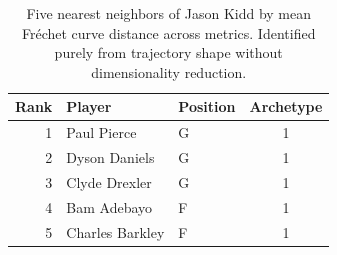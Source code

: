 \begin{table}[htbp]
  \centering\small
  \begin{tabular}{rllc}
    \toprule
    Rank & Player & Position & Archetype \\
    \midrule
    1 & Paul Pierce & G & 1 \\
    2 & Dyson Daniels & G & 1 \\
    3 & Clyde Drexler & G & 1 \\
    4 & Bam Adebayo & F & 1 \\
    5 & Charles Barkley & F & 1 \\
    \bottomrule
  \end{tabular}
  \caption{Five nearest neighbors of Jason Kidd by mean Fr\'{e}chet curve distance across metrics. Identified purely from trajectory shape without dimensionality reduction.}
  \label{tab:Jason_Kidd_frechet_curve_neighbors}
\end{table}

